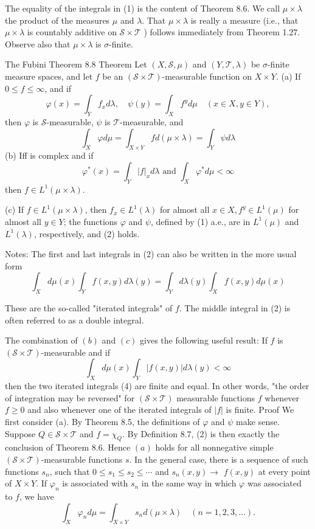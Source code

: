 The equality of the integrals in (1) is the content of Theorem 8.6. We call $\mu \times \lambda$ the product of the measures $\mu$ and $\lambda$. That $\mu \times \lambda$ is really a measure (i.e., that $\mu \times \lambda$ is countably additive on $\mathscr{S} \times \mathscr{T}$ ) follows immediately from Theorem 1.27.
Observe also that $\mu \times \lambda$ is $\sigma$-finite.

The Fubini Theorem
8.8 Theorem Let $(X, \mathscr{S}, \mu)$ and $(Y, \mathscr{T}, \lambda)$ be $\sigma$-finite measure spaces, and let $f$ be an $(\mathscr{S} \times \mathscr{T})$-measurable function on $X \times Y$.
(a) If $0 \leq f \leq \infty$, and if
$$
\varphi(x)=\int_Y f_x d \lambda, \quad \psi(y)=\int_X f^y d \mu \quad(x \in X, y \in Y),
$$
then $\varphi$ is $\mathscr{S}$-measurable, $\psi$ is $\mathscr{T}$-measurable, and
$$
\int_X \varphi d \mu=\int_{X \times Y} f d(\mu \times \lambda)=\int_Y \psi d \lambda
$$
(b) Iff is complex and if
$$
\varphi^*(x)=\int_Y|f|_x d \lambda \text { and } \int_X \varphi^* d \mu<\infty
$$
then $f \in L^1(\mu \times \lambda)$.

(c) If $f \in L^1(\mu \times \lambda)$, then $f_x \in L^1(\lambda)$ for almost all $x \in X, f^y \in L^1(\mu)$ for almost all $y \in Y$; the functions $\varphi$ and $\psi$, defined by (1) a.e., are in $L^1(\mu)$ and $L^1(\lambda)$, respectively, and (2) holds.

Notes: The first and last integrals in (2) can also be written in the more usual form
$$
\int_X d \mu(x) \int_Y f(x, y) d \lambda(y)=\int_Y d \lambda(y) \int_X f(x, y) d \mu(x)
$$

These are the so-called "iterated integrals" of $f$. The middle integral in (2) is often referred to as a double integral.

The combination of $(b)$ and $(c)$ gives the following useful result: If $f$ is $(\mathscr{S} \times \mathscr{T})$-measurable and if
$$
\int_X d \mu(x) \int_Y|f(x, y)| d \lambda(y)<\infty
$$
then the two iterated integrals (4) are finite and equal.
In other words, "the order of integration may be reversed" for $(\mathscr{S} \times \mathscr{T})$ measurable functions $f$ whenever $f \geq 0$ and also whenever one of the iterated integrals of $|f|$ is finite.
Proof We first consider (a). By Theorem 8.5, the definitions of $\varphi$ and $\psi$ make sense. Suppose $Q \in \mathscr{S} \times \mathscr{T}$ and $f=\chi_Q$. By Definition 8.7, (2) is then exactly the conclusion of Theorem 8.6. Hence $(a)$ holds for all nonnegative simple $(\mathscr{S} \times \mathscr{T})$-measurable functions $s$. In the general case, there is a sequence of such functions $s_n$, such that $0 \leq s_1 \leq s_2 \leq \cdots$ and $s_n(x, y) \rightarrow$ $f(x, y)$ at every point of $X \times Y$. If $\varphi_n$ is associated with $s_n$ in the same way in which $\varphi$ was associated to $f$, we have
$$
\int_X \varphi_n d \mu=\int_{X \times Y} s_n d(\mu \times \lambda) \quad(n=1,2,3, \ldots) .
$$

